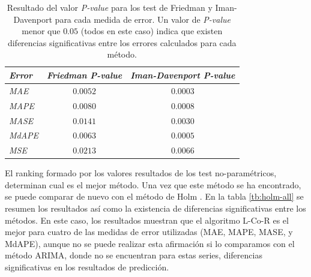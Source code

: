 \documentclass[runningheads]{llncs}
\begin{document}
\begin{table} \footnotesize
 \begin{center}
 \begin{tabular}{|l|c|c|}
\hline
\emph{Error} & \emph{Friedman P-value} & \emph{Iman-Davenport P-value} \\
\hline
\emph{MAE} & $0.0052$ & $0.0003$ \\
\emph{MAPE} & $0.0080$ & $0.0008$ \\
\emph{MASE} & $0.0141$ & $0.0030$ \\
\emph{MdAPE} & $0.0063$ & $0.0005$ \\
\emph{MSE} & $0.0213$ & $0.0066$ \\
\hline

 \end{tabular}
 \end{center}
 \caption{Resultado del valor \emph{P-value} para los test de Friedman y Iman-Davenport
para cada medida de error. Un valor de \emph{P-value} menor que $0.05$ (todos en este caso)
indica que existen diferencias significativas entre los errores calculados para cada
método.
 \label{tb:friedman-iman-tests}}
 \end{table}

El ranking formado por los valores resultados de los test no-paramétricos, determinan cual es el
mejor método. Una vez que este método se ha encontrado, se puede comparar de nuevo con el método de
Holm \cite{Holm1979}. En la tabla \ref{tb:holm-all} se resumen los resultados así como la
existencia de diferencias significativas entre los métodos. En este caso, los resultados muestran
que el algoritmo L-Co-R es el mejor para cuatro de las medidas de error utilizadas (MAE, MAPE,
MASE, y MdAPE), aunque no se puede realizar esta afirmación si lo comparamos con el método ARIMA,
donde no se encuentran para estas series, diferencias significativas en los resultados de
predicción.  
\end{document}
